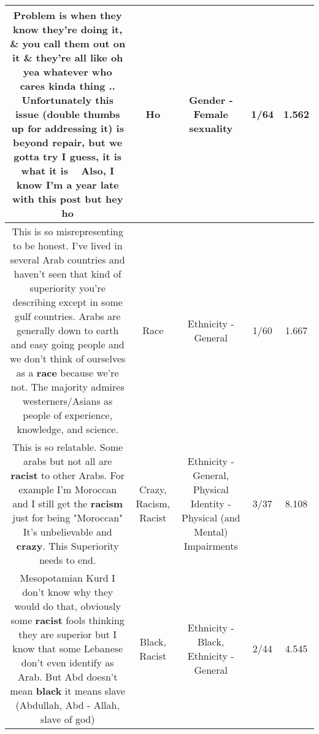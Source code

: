 \documentclass[11pt]{article}
\newlength\mylength
\begin{document}
\begin{center}
\begin{longtable}{|C{.65\mylength}|C{.30\mylength}|C{.12\mylength}|C{.12\mylength}|C{.12\mylength}|}
  \small Problem is when they know they're doing it, \& you call them out on it \& they're all like oh yea whatever who cares kinda thing .. Unfortunately this issue (double thumbs up for addressing it) is beyond repair, but we gotta try I guess, it is what it is 🤷‍♀️ Also, I know I'm a year late with this post but hey ho\normalsize   & Ho & Gender - Female sexuality & 1/64 & 1.562 \\  \hline
  \small This is so misrepresenting to be honest. I've lived in several Arab countries and haven't seen that kind of superiority you're describing except in some gulf countries. Arabs are generally down to earth and easy going people and we don't think of ourselves as a \textbf{race} because we're not. The majority admires westerners/Asians as people of experience, knowledge, and science.\normalsize   & Race & Ethnicity - General & 1/60 & 1.667 \\  \hline
  \small This is so relatable. Some arabs but not all are \textbf{racist} to other Arabs. For example I'm Moroccan and I still get the \textbf{racism} just for being "Moroccan" It's unbelievable and \textbf{crazy}. This Superiority needs to end.\normalsize   & Crazy, Racism, Racist & Ethnicity - General, Physical Identity - Physical (and Mental) Impairments & 3/37 & 8.108 \\  \hline
  \small Mesopotamian Kurd I don't know why they would do that, obviously some \textbf{racist} fools thinking they are superior but I know that some Lebanese don't even identify as Arab. But Abd doesn't mean \textbf{black} it means slave (Abdullah, Abd - Allah, slave of god)\normalsize   & Black, Racist & Ethnicity - Black, Ethnicity - General & 2/44 & 4.545 \\  \hline

\end{longtable}
\end{center}
\end{document}
